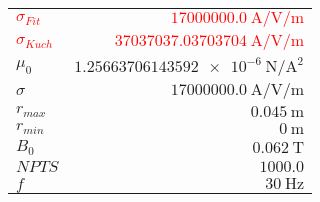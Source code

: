
{%
    \begin{center}
    \label{tab:fitparams:alu:rad:approx:low}
    \begin{tabular}{lr}
    \toprule
        \textcolor{red}{$\sigma_{Fit}$} & \textcolor{red}{$\SI{17000000.0}{\ampere\per\volt\per\meter}$}\\
        \textcolor{red}{$\sigma_{Kuch}$} & \textcolor{red}{$\SI{37037037.03703704}{\ampere\per\volt\per\meter}$}\\
        $\mu_0$ & $\SI{1.25663706143592e-6}{\newton\per\ampere\squared}$\\
        $\sigma$ & $\SI{17000000.0}{\ampere\per\volt\per\meter}$\\
        $r_{max}$ & $\SI{0.045}{\meter}$\\
        $r_{min}$ & $\SI{0}{\meter}$\\
        $B_0$ & $\SI{0.062}{\tesla}$\\
        $NPTS$ & $\num{1000.0}$\\
        $f$ & $\SI{30}{\hertz}$\\

    \bottomrule
    \end{tabular}
    \end{center}
}

